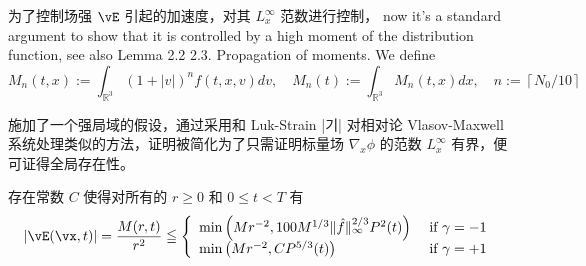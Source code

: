 




为了控制场强 $\vE$ 引起的加速度，对其 $L_{x}^{\infty}$ 范数进行控制，  now it's a standard argument to show that it is controlled by a high moment of the distribution function, see also Lemma 2.2
2.3. Propagation of moments. We define
\[
M_{n}(t, x):=\int_{\mathbb{R}^{3}}(1+|v|)^{n} f(t, x, v) d v, \quad M_{n}(t):=\int_{\mathbb{R}^{3}} M_{n}(t, x) d x, \quad n:=\left\lceil N_{0} / 10\right\rceil
\]



施加了一个强局域的假设，通过采用和 Luk-Strain |기| 对相对论 Vlasov-Maxwell 系统处理类似的方法，证明被简化为了只需证明标量场 $\nabla_{x} \phi$ 的范数 $L_{x}^{\infty}$ 有界，便可证得全局存在性。


\begin{lemma}
    存在常数 $C$ 使得对所有的 $r \geq 0$ 和 $0 \leq t<T$ 有
    $$
    |\vE(\vx, t)|=\frac{M(r, t)}{r^{2}} \leqq\left\{\begin{array}{ll}
    {\min \left(M r^{-2}, 100 M^{1 / 3}\|\hat{f}\|_{\infty}^{2 / 3} P^{2}(t)\right)} & {\text { if } \gamma=-1} \\
    {\min \left(M r^{-2}, C P^{5 / 3}(t)\right)} & {\text { if } \gamma=+1}
    \end{array}\right.
    $$
    \end{lemma}

